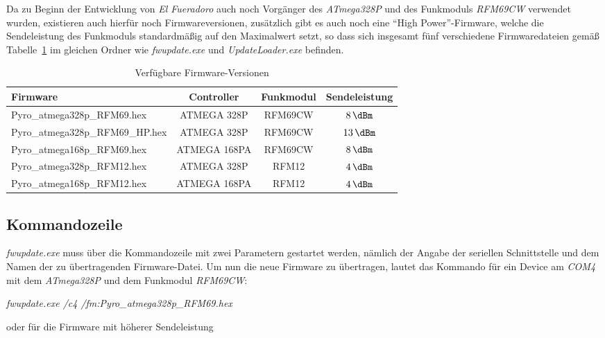 \documentclass[paper=a4, parskip, numbers=noenddot, toc=listof, headsepline]{scrbook}
\newcommand{\anlage}{\emph{El Fueradoro}}
\begin{document}
			Da zu Beginn der Entwicklung von {\anlage} auch noch Vorgänger des \emph{ATmega328P} und des Funkmoduls \emph{RFM69CW} verwendet wurden, existieren auch hierfür noch Firmwareversionen, zusätzlich gibt es auch noch eine \enquote{High Power}-Firmware, welche die Sendeleistung des Funkmoduls standardmäßig auf den Maximalwert setzt, so dass sich insgesamt fünf verschiedene Firmwaredateien gemäß Tabelle~\ref{tab:firmwareversions} im gleichen Ordner wie \emph{fwupdate.exe} und \emph{UpdateLoader.exe} befinden.

			\begin{table}
				\centering
				\begin{tabularx}{.925\textwidth}{Xccc}
					\hline\hline
					Firmware                        & Controller   & Funkmodul & Sendeleistung   \\ \hline
					Pyro\_atmega328p\_RFM69.hex     & ATMEGA 328P  & RFM69CW   & $\SI{8}{\dBm}$  \\
					Pyro\_atmega328p\_RFM69\_HP.hex & ATMEGA 328P  & RFM69CW   & $\SI{13}{\dBm}$ \\
					Pyro\_atmega168p\_RFM69.hex     & ATMEGA 168PA & RFM69CW   & $\SI{8}{\dBm}$  \\
					Pyro\_atmega328p\_RFM12.hex     & ATMEGA 328P  & RFM12     & $\SI{4}{\dBm}$  \\
					Pyro\_atmega168p\_RFM12.hex     & ATMEGA 168PA & RFM12     & $\SI{4}{\dBm}$  \\ \hline\hline
				\end{tabularx}
				\caption{Verfügbare Firmware-Versionen}
				\label{tab:firmwareversions}
			\end{table}

			\subsection{Kommandozeile}

				\emph{fwupdate.exe} muss über die Kommandozeile mit zwei Parametern gestartet werden, nämlich der Angabe der seriellen Schnittstelle und dem Namen der zu übertragenden Firmware-Datei. Um nun die neue Firmware zu übertragen, lautet das Kommando für ein Device am \emph{COM4} mit dem \emph{ATmega328P} und dem Funkmodul \emph{RFM69CW}:

				\begin{center}
					\emph{fwupdate.exe /c4 /fm:Pyro\_atmega328p\_RFM69.hex}
				\end{center}

				oder für die Firmware mit höherer Sendeleistung
\end{document}
